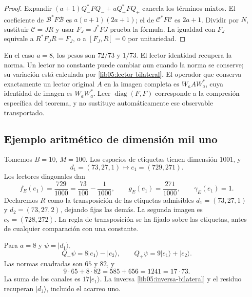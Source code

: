 \begin{proof}
Expandir \((a+1)Q_-^*FQ_-+aQ_+^*FQ_+\) cancela los
términos mixtos. El coeficiente de \(\mathcal B^*F\mathcal B\)
es \(a(a+1)(2a+1)\); el de
\(\mathcal C^*F\mathcal C\) es \(2a+1\). Dividir por
\(N\), sustituir \(\mathcal C=JR\) y usar
\(F_J=J^*FJ\) prueba la fórmula. La igualdad con \(F_J\)
equivale a \(R^*F_JR=F_J\), o a \([F_J,R]=0\) por
unitariedad.
\end{proof}

En el caso \(a=8\), los pesos son \(72/73\) y \(1/73\).
El lector identidad recupera la norma. Un lector no constante
puede cambiar aun cuando la norma se conserve; su variación está
calculada por \eqref{lib05:lector-bilateral}.
El operador que conserva exactamente un lector original \(A\)
en la imagen completa es \(W_aAW_a^*\), cuya identidad de imagen
es \(W_aW_a^*\). Leer \(\operatorname{diag}(F,F)\) corresponde
a la compresión específica del teorema, y no sustituye
automáticamente ese observable transportado.

\subsection{Ejemplo aritmético de dimensión mil uno}
\label{lib05:ejemplo}

Tomemos \(B=10\), \(M=100\). Los espacios de etiquetas tienen
dimensión \(1001\), y
\begin{equation}
 d_1=(73,27,1)\longmapsto e_1=(729,271).
 \label{lib05:ejemplo-etiqueta}
\end{equation}
Los lectores diagonales dan
\begin{equation}
 f_E(e_1)=\frac{729}{1000}
 =\frac{73}{100}-\frac1{1000},\qquad
 g_E(e_1)=\frac{271}{1000},\qquad \gamma_E(e_1)=1.
 \label{lib05:ejemplo-lectores}
\end{equation}
Declaremos \(R\) como la transposición de las etiquetas
admisibles \(d_1=(73,27,1)\) y \(d_2=(73,27,2)\), dejando
fijas las demás. La segunda imagen es \(e_2=(728,272)\).
La regla de transposición se ha fijado sobre las etiquetas, antes
de cualquier comparación con una constante.

Para \(a=8\) y \(\psi=|d_1\rangle\),
\begin{equation}
 Q_-\psi=8|e_1\rangle-|e_2\rangle,\qquad
 Q_+\psi=9|e_1\rangle+|e_2\rangle.
 \label{lib05:ejemplo-canales}
\end{equation}
Las normas cuadradas son \(65\) y \(82\), y
\begin{equation}
 9\cdot65+8\cdot82=585+656=1241=17\cdot73.
 \label{lib05:ejemplo-balance}
\end{equation}
La suma de los canales es \(17|e_1\rangle\). La inversa
\eqref{lib05:inversa-bilateral} y el residuo recuperan
\(|d_1\rangle\), incluido el acarreo uno.

